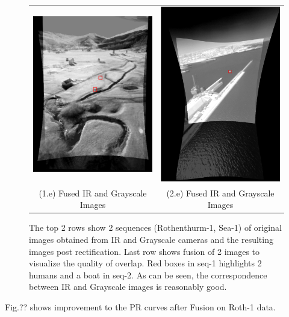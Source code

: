 \documentclass[runningheads]{llncs}
\begin{document}
\begin{figure}
  \begin{tabular}{cc}
  	\includegraphics[width=6cm]{img/fusion/Roth/Grayscale_and_Infrared_overlaid_Image_screenshot.png} &
  	\includegraphics[width=6cm]{img/fusion/Sea/3/Grayscale_and_Infrared_overlaid_Image_screenshot.png} \\
  	\small (1.e) Fused IR and Grayscale Images &
  	\small (2.e) Fused IR and Grayscale Images
  \end{tabular}

  \caption{The top 2 rows show 2 sequences (Rothenthurm-1, Sea-1) of original images obtained from IR and Grayscale cameras and the resulting images post rectification. Last row shows fusion of 2 images to visualize the quality of overlap. Red boxes in seq-1 highlights 2 humans and a boat in seq-2. As can be seen, the correspondence between IR and Grayscale images is reasonably good.}\label{fig:fusion}
\end{figure}

Fig.?? shows improvement to the PR curves after Fusion on Roth-1 data.
\end{document}
